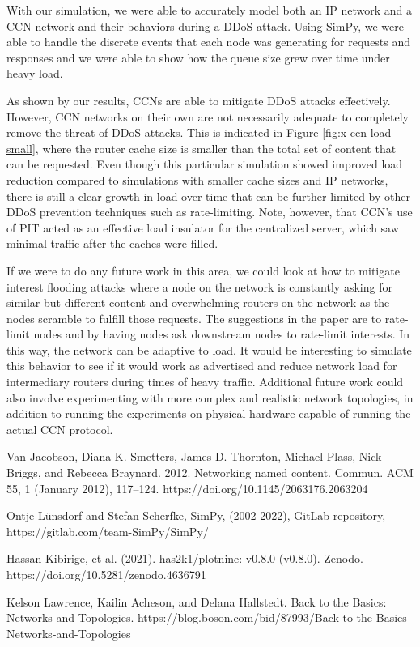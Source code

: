 \documentclass[conference,compsoc, 10pt]{IEEEtran}
\begin{document}
With our simulation, we were able to accurately model both an IP network and a CCN network and their behaviors during a DDoS attack. Using SimPy, we were able to handle the discrete events that each node was generating for requests and responses and we were able to show how the queue size grew over time under heavy load.

As shown by our results, CCNs are able to mitigate DDoS attacks effectively. However, CCN networks on their own are not necessarily adequate to completely remove the threat of DDoS attacks. This is indicated in Figure \ref{fig:x ccn-load-small}, where the router cache size is smaller than the total set of content that can be requested. Even though this particular simulation showed improved load reduction compared to simulations with smaller cache sizes and IP networks, there is still a clear growth in load over time that can be further limited by other DDoS prevention techniques such as rate-limiting. Note, however, that CCN's use of PIT acted as an effective load insulator for the centralized server, which saw minimal traffic after the caches were filled.

If we were to do any future work in this area, we could look at how to mitigate interest flooding attacks where a node on the network is constantly asking for similar but different content and overwhelming routers on the network as the nodes scramble to fulfill those requests. The suggestions in the paper are to rate-limit nodes and by having nodes ask downstream nodes to rate-limit interests. In this way, the network can be adaptive to load. It would be interesting to simulate this behavior to see if it would work as advertised and reduce network load for intermediary routers during times of heavy traffic. Additional future work could also involve experimenting with more complex and realistic network topologies, in addition to running the experiments on physical hardware capable of running the actual CCN protocol.

\begin{thebibliography}{1}

Van Jacobson, Diana K. Smetters, James D. Thornton, Michael Plass, Nick Briggs, and Rebecca Braynard. 2012. Networking named content. Commun. ACM 55, 1 (January 2012), 117–124. https://doi.org/10.1145/2063176.2063204

Ontje Lünsdorf and Stefan Scherfke, SimPy, (2002-2022), GitLab repository, https://gitlab.com/team-SimPy/SimPy/

Hassan Kibirige, et al. (2021). has2k1/plotnine: v0.8.0 (v0.8.0). Zenodo. https://doi.org/10.5281/zenodo.4636791

Kelson Lawrence, Kailin Acheson, and Delana Hallstedt. Back to the Basics: Networks and Topologies. https://blog.boson.com/bid/87993/Back-to-the-Basics-Networks-and-Topologies

\end{thebibliography}
\end{document}
